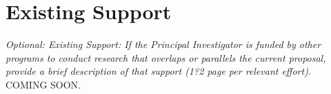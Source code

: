 \documentclass[11pt,english,letterpaper]{scrartcl}
\begin{document}
%
%
\section{Existing Support}

\textit{Optional: Existing Support: If the Principal Investigator is funded by other programs to conduct research that overlaps or parallels the current proposal, provide a brief description of that support (1?2 page per relevant effort).} \\

COMING SOON.
\end{document}
